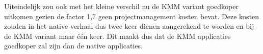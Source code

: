 Uiteindelijk zou ook met het kleine verschil nu de KMM variant goedkoper uitkomen gezien de factor 1,7 geen projectmanagement kosten bevat. Deze kosten zouden in het native verhaal dus twee keer dienen aangerekend te worden en bij de KMM variant maar één keer. Dit maakt dus dat de KMM applicaties goedkoper zal zijn dan de native applicaties.





